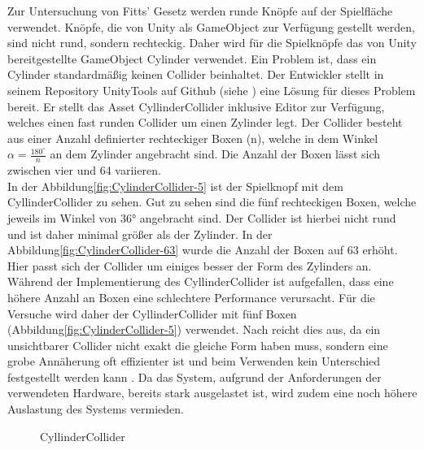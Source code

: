 Zur Untersuchung von Fitts' Gesetz werden runde Knöpfe auf der Spielfläche verwendet. Knöpfe, die von Unity als {\ttfamily GameObject} zur Verfügung gestellt werden, sind nicht rund, sondern rechteckig. Daher wird für die Spielknöpfe das von Unity bereitgestellte GameObject {\ttfamily Cylinder} verwendet. Ein Problem ist, dass ein {\ttfamily Cylinder} standardmäßig keinen Collider beinhaltet. Der Entwickler \citeauthor{kode80.2016} stellt in seinem Repository UnityTools auf Github (siehe \cite{kode80.2016}) eine Lösung für dieses Problem bereit. Er stellt das Asset {\ttfamily CyllinderCollider} inklusive Editor zur Verfügung, welches einen fast runden Collider um einen Zylinder legt. Der Collider besteht aus einer Anzahl definierter rechteckiger Boxen (n), welche in dem Winkel $\alpha = \frac{180^\circ}{n}$ an dem Zylinder angebracht sind. Die Anzahl der Boxen lässt sich zwischen vier und 64 variieren.\\
In der Abbildung\autoref{fig:CylinderCollider-5} ist der Spielknopf mit dem {\ttfamily CyllinderCollider} zu sehen. Gut zu sehen sind die fünf rechteckigen Boxen, welche jeweils im Winkel von 36° angebracht sind. Der Collider ist hierbei nicht rund und ist daher minimal größer als der Zylinder. In der Abbildung\autoref{fig:CylinderCollider-63} wurde die Anzahl der Boxen auf 63 erhöht. Hier passt sich der Collider um einiges besser der Form des Zylinders an. Während der Implementierung des {\ttfamily CyllinderCollider} ist aufgefallen, dass eine höhere Anzahl an Boxen eine schlechtere Performance verursacht. Für die Versuche wird daher der {\ttfamily CyllinderCollider} mit fünf Boxen (Abbildung\autoref{fig:CylinderCollider-5}) verwendet. Nach \citeauthor{Colliders.2020} reicht dies aus, da ein unsichtbarer Collider nicht exakt die gleiche Form haben muss, sondern eine grobe Annäherung oft effizienter ist und beim Verwenden kein Unterschied festgestellt werden kann \cite{Colliders.2020}. Da das System, aufgrund der Anforderungen der verwendeten Hardware, bereits stark ausgelastet ist, wird zudem eine noch höhere Auslastung des Systems vermieden.

\begin{figure}[!htbp]
	\centering
	\qquad      
	\caption{CyllinderCollider}
	\label{fig:CylinderCollider}
\end{figure}  

